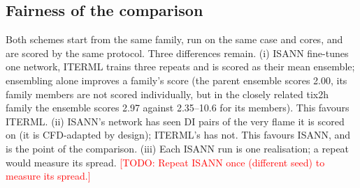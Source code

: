 \documentclass[preprint,review,12pt]{elsarticle}
\newcommand{\todo}[1]{\textcolor{red}{[TODO: #1]}}
\begin{document}
\begin{table}[t]
\centering
\caption{Design differences between the two schemes.}
\label{tab:design}
\small
{}
\end{table}

\subsection{Fairness of the comparison}
\label{sec:fair}
Both schemes start from the same family, run on the same case and cores, and are scored by the same
protocol. Three differences remain. (i) ISANN fine-tunes one network, ITERML trains three repeats and is
scored as their mean ensemble; ensembling alone improves a family's score (the parent ensemble scores 2.00,
its family members are not scored individually, but in the closely related tix2h family the ensemble scores
2.97 against 2.35--10.6 for its members). This favours ITERML. (ii) ISANN's network has seen DI pairs of the
very flame it is scored on (it is CFD-adapted by design); ITERML's has not. This favours ISANN, and is the
point of the comparison. (iii) Each ISANN run is one realisation; a repeat would measure its spread.
\todo{Repeat ISANN once (different seed) to measure its spread.}
\end{document}
